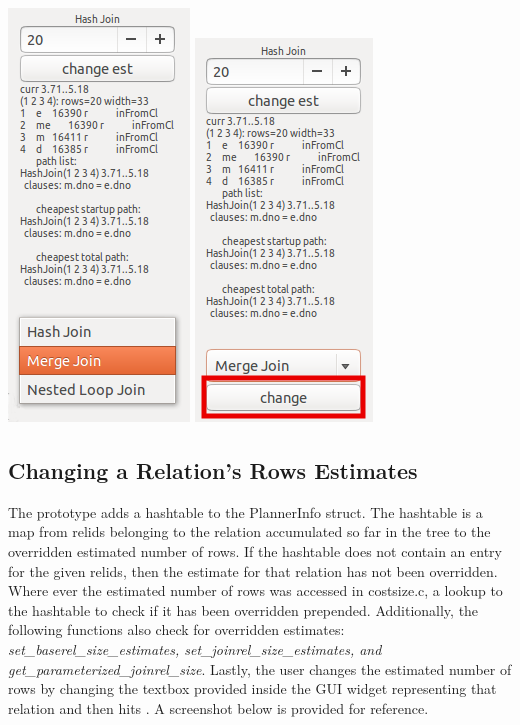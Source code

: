 \documentclass[letterpaper,10pt]{article}
\begin{document}
\begin{center}
\includegraphics[scale=0.5]{join-ddl.png}
\includegraphics[scale=0.5]{join-ddl-selected.png}
\end{center}

\subsection{Changing a Relation's Rows Estimates}
The prototype adds a hashtable to the PlannerInfo struct. The hashtable is a map
from relids belonging to the relation accumulated so far in the tree to the
overridden estimated number of rows. If the hashtable does not contain an entry
for the given relids, then the estimate for that relation has not been overridden.
Where ever the estimated number of rows was accessed in costsize.c, a lookup to
the hashtable to check if it has been overridden prepended. Additionally, the
following functions also check for overridden estimates:
\textit{set\_baserel\_size\_estimates, set\_joinrel\_size\_estimates, and
get\_parameterized\_joinrel\_size}. Lastly, the user changes the estimated number of
rows by changing the textbox provided inside the GUI widget representing that
relation and then hits . A screenshot below is provided for reference.
\end{document}
